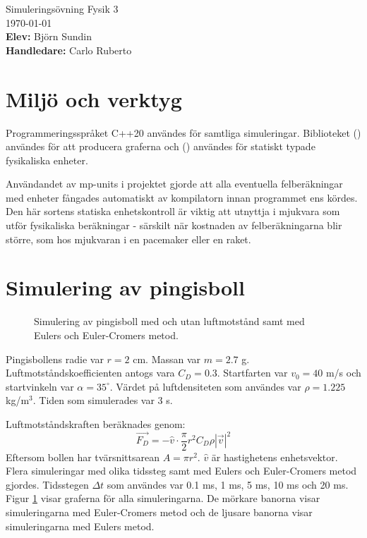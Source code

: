 \documentclass[12pt, a4paper]{article}
\begin{document}
\begin{titlepage}
    \begin{center}
        \Huge{Simuleringsövning Fysik 3}\bigskip \\
        \LARGE \today\vspace{1cm}\\
        \large {}
        \textbf{Elev:} Björn Sundin\\
        \textbf{Handledare:} Carlo Ruberto
    \end{center}
\end{titlepage}

\section{Miljö och verktyg}
Programmeringsspråket C++20 användes för samtliga simuleringar. Biblioteket  (\cite{matplotplusplus}) användes för att producera graferna och  (\cite{mp-units}) användes för statiskt typade fysikaliska enheter. 

Användandet av mp-units i projektet gjorde att alla eventuella felberäkningar med enheter fångades automatiskt av kompilatorn innan programmet ens kördes. Den här sortens statiska enhetskontroll är viktig att utnyttja i mjukvara som utför fysikaliska beräkningar - särskilt när kostnaden av felberäkningarna blir större, som hos mjukvaran i en pacemaker eller en raket.

\section{Simulering av pingisboll}
\begin{figure}[ht]
    \centering
    \caption{Simulering av pingisboll med och utan luftmotstånd samt med Eulers och Euler-Cromers metod.}
    
    \label{fig:pingisboll}
\end{figure}

Pingisbollens radie var $r=2$ cm. Massan var $m=2.7$ g. Luftmotstånds\-koefficienten antogs vara $C_D=0.3$. Startfarten var $v_0=40$ m/s och startvinkeln var $\alpha=35^\circ$. Värdet på luftdensiteten som användes var $\rho=1.225$ kg/m$^3$. Tiden som simulerades var 3 s.

Luftmotståndskraften beräknades genom: 
\begin{equation*}
    \vec{F_D}=-\hat{v}\cdot\frac{\pi}{2}r^2C_D\rho|\vec{v}|^2
\end{equation*}
Eftersom bollen har tvärsnittsarean $A=\pi r^2$. $\hat{v}$ är hastighetens enhetsvektor.
Flera simuleringar med olika tidssteg samt med Eulers och Euler-Cromers metod gjordes. Tidsstegen $\Delta t$ som användes var 0.1 ms, 1 ms, 5 ms, 10 ms och 20 ms. Figur \ref{fig:pingisboll} visar graferna för alla simuleringarna. De mörkare banorna visar simuleringarna med Euler-Cromers metod och de ljusare banorna visar simuleringarna med Eulers metod.
\end{document}
